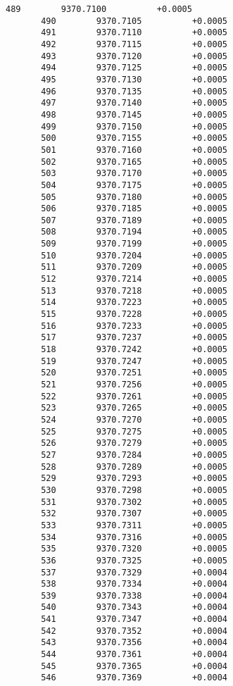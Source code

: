 \documentclass[11pt]{article}
\begin{document}
\begin{Verbatim}[commandchars=\\\{\}]
       489        9370.7100          +0.0005
       490        9370.7105          +0.0005
       491        9370.7110          +0.0005
       492        9370.7115          +0.0005
       493        9370.7120          +0.0005
       494        9370.7125          +0.0005
       495        9370.7130          +0.0005
       496        9370.7135          +0.0005
       497        9370.7140          +0.0005
       498        9370.7145          +0.0005
       499        9370.7150          +0.0005
       500        9370.7155          +0.0005
       501        9370.7160          +0.0005
       502        9370.7165          +0.0005
       503        9370.7170          +0.0005
       504        9370.7175          +0.0005
       505        9370.7180          +0.0005
       506        9370.7185          +0.0005
       507        9370.7189          +0.0005
       508        9370.7194          +0.0005
       509        9370.7199          +0.0005
       510        9370.7204          +0.0005
       511        9370.7209          +0.0005
       512        9370.7214          +0.0005
       513        9370.7218          +0.0005
       514        9370.7223          +0.0005
       515        9370.7228          +0.0005
       516        9370.7233          +0.0005
       517        9370.7237          +0.0005
       518        9370.7242          +0.0005
       519        9370.7247          +0.0005
       520        9370.7251          +0.0005
       521        9370.7256          +0.0005
       522        9370.7261          +0.0005
       523        9370.7265          +0.0005
       524        9370.7270          +0.0005
       525        9370.7275          +0.0005
       526        9370.7279          +0.0005
       527        9370.7284          +0.0005
       528        9370.7289          +0.0005
       529        9370.7293          +0.0005
       530        9370.7298          +0.0005
       531        9370.7302          +0.0005
       532        9370.7307          +0.0005
       533        9370.7311          +0.0005
       534        9370.7316          +0.0005
       535        9370.7320          +0.0005
       536        9370.7325          +0.0005
       537        9370.7329          +0.0004
       538        9370.7334          +0.0004
       539        9370.7338          +0.0004
       540        9370.7343          +0.0004
       541        9370.7347          +0.0004
       542        9370.7352          +0.0004
       543        9370.7356          +0.0004
       544        9370.7361          +0.0004
       545        9370.7365          +0.0004
       546        9370.7369          +0.0004

\end{Verbatim}
\end{document}
